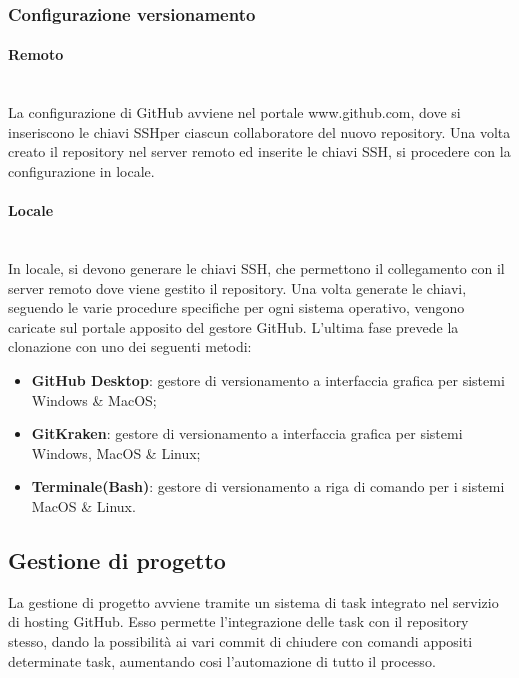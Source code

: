 \subsubsection{Configurazione versionamento}

\paragraph{Remoto} \-\\
	La configurazione di GitHub avviene nel portale www.github.com, dove si inseriscono le chiavi SSH\glossario per ciascun collaboratore del nuovo repository. 
	Una volta creato il repository nel server remoto ed inserite le chiavi SSH, si procedere con la configurazione in locale.
	
\paragraph{Locale} \-\\
	In locale, si devono generare le chiavi SSH, che permettono il collegamento con il server remoto dove viene gestito il repository. 
	Una volta generate le chiavi, seguendo le varie procedure specifiche per ogni sistema operativo, vengono caricate sul portale apposito del gestore GitHub.
	L'ultima fase prevede la clonazione con uno dei seguenti metodi: 

	\begin{itemize}
		\item \textbf{GitHub Desktop}: gestore di versionamento a interfaccia grafica per sistemi Windows \& MacOS; 
		\item \textbf{GitKraken}: gestore di versionamento a interfaccia grafica per sistemi Windows, MacOS \& Linux; 		
		\item \textbf{Terminale(Bash)}: gestore di versionamento a riga di comando per i sistemi MacOS \& Linux.
	\end{itemize}
		
\subsection{Gestione di progetto}
\label{ProcessiSupporto_GestioneProgetto}
La gestione di progetto avviene tramite un sistema di task integrato nel servizio di hosting GitHub. 
Esso permette l'integrazione delle task con il repository stesso, dando la possibilità ai vari commit di chiudere con comandi appositi determinate task, aumentando cosi l'automazione di tutto il processo. 

